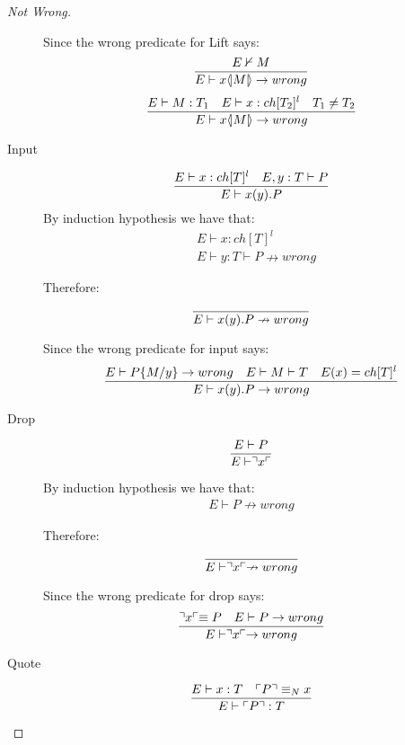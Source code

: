 \begin{proof}[Not Wrong]
\begin{description}
	    Since the wrong predicate for Lift says:
	    \begin{align*}
	    \frac{E \nvdash M}{E \vdash x \langle \! | M | \! \rangle \rightarrow wrong}
	    \end{align*}
	    \begin{align*}
	    \frac{E \vdash M:T_1 \quad E \vdash x:ch[T_2]^l \quad T_1 \neq T_2}{E \vdash x \langle \! | M | \! \rangle \rightarrow wrong}
	    \end{align*}
	\item[Input]
	    \begin{align*}
	    \frac{E \vdash x:ch[T]^l \quad E,y:T \vdash P}{E \vdash x(y).P}
	    \end{align*}
	    By induction hypothesis we have that:
	    \begin{align*}
	    &E \vdash x:ch[T]^l\\
	    &E \vdash y:T \vdash P \nrightarrow wrong
	    \end{align*}
	    
	    Therefore:
	    \begin{align*}
	    \frac{}{E \vdash x(y).P \nrightarrow wrong}
	    \end{align*}
	    
	    Since the wrong predicate for input says:
	    \begin{align*}
	    \frac{E \vdash P\{M/y\}\rightarrow wrong \quad E\vdash M\vdash T \quad E(x)=ch[T]^l}{E \vdash x(y).P \rightarrow wrong}
	    \end{align*}
	\item[Drop]
		\begin{align*}
		\frac{E \vdash P}{E \vdash \urcorner x \ulcorner}
		\end{align*}
		
		By induction hypothesis we have that:
		\begin{align*}
		E \vdash P \nrightarrow wrong
		\end{align*}
		
		Therefore:
		\begin{align*}
		\frac{}{E \vdash \urcorner x \ulcorner \nrightarrow wrong}
		\end{align*}
		
		Since the wrong predicate for drop says:
		\begin{align*}
		\frac{\urcorner x \ulcorner \equiv P \quad E \vdash P \rightarrow wrong}{E \vdash \urcorner x \ulcorner \rightarrow wrong}
		\end{align*}
	\item[Quote]
		\begin{align*}
		\frac{E \vdash x:T \quad \ulcorner P \urcorner \equiv _N x}{E \vdash \ulcorner P \urcorner:T}
		\end{align*}
		

\end{description}
\end{proof}
